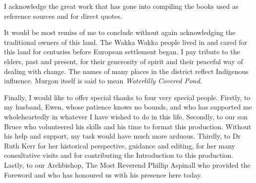 I acknowledge the great work that has gone into compiling the books used as reference sources and for direct quotes.



It would be most remiss of me to conclude without again acknowledging the traditional owners of this land. The Wakka Wakka people lived in and cared for this land for centuries before European settlement began. I pay tribute to the elders, past and present, for their generosity of spirit and their peaceful way of dealing with change. The names of many places in the district reflect Indigenous influence. Murgon itself is said to mean \emph{Waterlilly Covered Pond}.



\balance
Finally, I would like to offer special thanks to four very special people. Firstly, to my husband, Ewen, whose patience knows no bounds, and who has supported me wholeheartedly in whatever I have wished to do in this life. Secondly, to our son Bruce who volunteered his skills and his time to format this production. Without his help and support, my task would have much more arduous. Thirdly, to Dr Ruth Kerr for her historical perspective, guidance and editing, for her many consultative visits and for contributing the Introduction to this production. Lastly, to our Archbishop, The Most Reverend Phillip Aspinall who provided the Foreword and who has honoured us with his presence here today.

